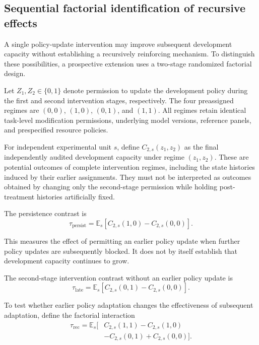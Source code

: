 \documentclass[11pt,a4paper]{article}
\begin{document}
\subsection{Sequential factorial identification of recursive effects}

A single policy-update intervention may improve subsequent development capacity without establishing
a recursively reinforcing mechanism. To distinguish these possibilities, a prospective extension uses
a two-stage randomized factorial design.

Let $Z_1,Z_2\in\{0,1\}$ denote permission to update the development policy during the first and second
intervention stages, respectively. The four preassigned regimes are $(0,0)$, $(1,0)$, $(0,1)$,
and $(1,1)$. All regimes retain identical task-level modification permissions, underlying
model versions, reference panels, and prespecified resource policies.

For independent experimental unit $s$, define $C_{2,s}(z_1,z_2)$ as the final independently
audited development capacity under regime $(z_1,z_2)$. These are potential outcomes of
complete intervention regimes, including the state histories induced by their earlier
assignments. They must not be interpreted as outcomes obtained by changing only the
second-stage permission while holding post-treatment histories artificially fixed.

The persistence contrast is
\begin{equation}
\tau_{\mathrm{persist}}
=
\mathbb{E}_s
\left[
C_{2,s}(1,0)-C_{2,s}(0,0)
\right].
\label{eq:persistence}
\end{equation}

This measures the effect of permitting an earlier policy update when further policy updates are subsequently blocked. It does not by itself establish that development capacity continues to grow.

The second-stage intervention contrast without an earlier policy update is
\begin{equation}
\tau_{\mathrm{late}}
=
\mathbb{E}_s
\left[
C_{2,s}(0,1)-C_{2,s}(0,0)
\right].
\label{eq:lateeffect}
\end{equation}

To test whether earlier policy adaptation changes the effectiveness of subsequent adaptation, define the factorial interaction
\begin{equation}
\begin{aligned}
\tau_{\mathrm{rec}}
=
\mathbb{E}_s\big[
&C_{2,s}(1,1)-C_{2,s}(1,0)\\
&-C_{2,s}(0,1)+C_{2,s}(0,0)
\big].
\end{aligned}
\label{eq:recursiveinteraction}
\end{equation}
\end{document}

